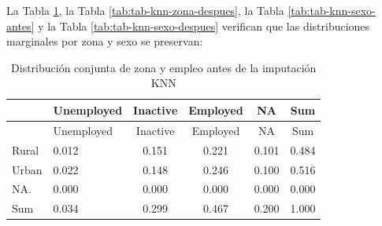 \documentclass[
  spanish,
  12pt,
]{book}
\newenvironment{Shaded}{\begin{snugshade}}{\end{snugshade}}
\newcommand{\AttributeTok}[1]{\textcolor[rgb]{0.13,0.29,0.53}{#1}}
\newcommand{\FunctionTok}[1]{\textcolor[rgb]{0.13,0.29,0.53}{\textbf{#1}}}
\newcommand{\NormalTok}[1]{#1}
\newcommand{\SpecialCharTok}[1]{\textcolor[rgb]{0.81,0.36,0.00}{\textbf{#1}}}
\newcommand{\StringTok}[1]{\textcolor[rgb]{0.31,0.60,0.02}{#1}}
\begin{document}
La Tabla \ref{tab:tab-knn-zona-antes}, la Tabla \ref{tab:tab-knn-zona-despues}, la Tabla \ref{tab:tab-knn-sexo-antes} y la Tabla \ref{tab:tab-knn-sexo-despues} verifican que las distribuciones marginales por zona y sexo se preservan:

\begin{Shaded}
\end{Shaded}

\begin{longtable}[]{@{}llcccc@{}}
\caption{\label{tab:tab-knn-zona-antes}Distribución conjunta de zona y empleo antes de la imputación KNN}\tabularnewline
\toprule\noalign{}
& Unemployed & Inactive & Employed & NA & Sum \\
\midrule\noalign{}
\endfirsthead
\toprule\noalign{}
& Unemployed & Inactive & Employed & NA & Sum \\
\midrule\noalign{}
\endhead
\bottomrule\noalign{}
\endlastfoot
Rural & 0.012 & 0.151 & 0.221 & 0.101 & 0.484 \\
Urban & 0.022 & 0.148 & 0.246 & 0.100 & 0.516 \\
NA. & 0.000 & 0.000 & 0.000 & 0.000 & 0.000 \\
Sum & 0.034 & 0.299 & 0.467 & 0.200 & 1.000 \\
\end{longtable}

\begin{Shaded}
\end{Shaded}
\end{document}

